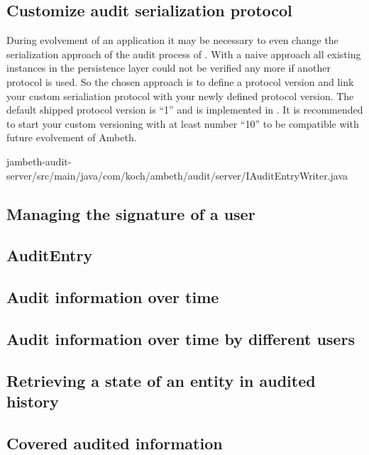 \subsection{Customize audit serialization protocol}
During evolvement of an application it may be necessary to even change the serialization approach of the audit process of . With a naive approach all existing  instances in the persistence layer could not be verified any more if another protocol is used. So the chosen approach is to define a protocol version and link your custom serialiation protocol with your newly defined protocol version. The default shipped protocol version is ``1'' and is implemented in . It is recommended to start your custom versioning with at least number ``10'' to be compatible with future evolvement of Ambeth.

	{jambeth-audit-server/src/main/java/com/koch/ambeth/audit/server/IAuditEntryWriter.java}
		
\subsection{Managing the signature of a user}
\TODO

\subsection{AuditEntry}
\TODO

\subsection{Audit information over time}
\TODO

\subsection{Audit information over time by different users}
\TODO

\subsection{Retrieving a state of an entity in audited history}
\TODO

\subsection{Covered audited information}
\TODO